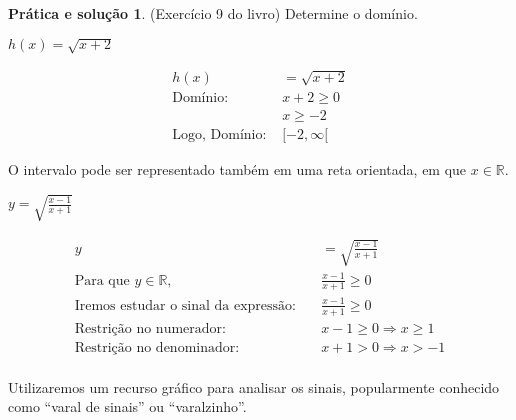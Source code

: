 \documentclass[12pt,openright,twoside,a4paper]{article}
\theoremstyle{definition}
\newtheorem{practice}{Prática e solução}[section]
\begin{document}
	\begin{practice}
		(Exercício 9 do livro) Determine o domínio.
		
		\item[e)] $h(x) = \sqrt{x + 2}$
		
		\begin{align*}
			h(x) &= \sqrt{x + 2} \\
			\text{Domínio: } & x + 2 \geq 0 \\
			& x \geq -2 \\
			\text{Logo, } \text{Domínio: } & [-2, \infty[
		\end{align*}
		
		O intervalo pode ser representado também em uma reta orientada, em que $x \in \mathbb{R}$.
		
		\begin{center}
		\end{center}
		\item[g)] $y = \sqrt{\frac{x - 1}{x + 1}}$
		
		\begin{align*}
			y &= \sqrt{\frac{x - 1}{x + 1}} \\
			\text{Para que } y \in \mathbb{R},\quad &\frac{x - 1}{x + 1} \geq 0 \\
			\text{Iremos estudar o sinal da expressão:} \quad &\frac{x - 1}{x + 1} \geq 0 \\
			\text{Restrição no numerador: } &x - 1 \geq 0 \Rightarrow x \geq 1 \\
			\text{Restrição no denominador: } &x + 1 > 0 \Rightarrow x > -1\\
		\end{align*}
		
		Utilizaremos um recurso gráfico para analisar os sinais, popularmente conhecido como ``varal de sinais'' ou ``varalzinho''. 
		

\end{practice}
\end{document}
